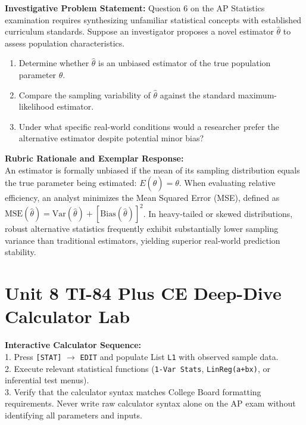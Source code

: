 \begin{frqrubricbox}
\textbf{Investigative Problem Statement:} Question 6 on the AP Statistics examination requires synthesizing unfamiliar statistical concepts with established curriculum standards. Suppose an investigator proposes a novel estimator $\hat{\theta}$ to assess population characteristics.
\begin{enumerate}[label=(\alph*)]
  \item Determine whether $\hat{\theta}$ is an unbiased estimator of the true population parameter $\theta$.
  \item Compare the sampling variability of $\hat{\theta}$ against the standard maximum-likelihood estimator.
  \item Under what specific real-world conditions would a researcher prefer the alternative estimator despite potential minor bias?
\end{enumerate}
\textbf{Rubric Rationale and Exemplar Response:}\\
An estimator is formally unbiased if the mean of its sampling distribution equals the true parameter being estimated: $E(\hat{\theta}) = \theta$. When evaluating relative efficiency, an analyst minimizes the Mean Squared Error (MSE), defined as $\text{MSE}(\hat{\theta}) = \text{Var}(\hat{\theta}) + [\text{Bias}(\hat{\theta})]^2$. In heavy-tailed or skewed distributions, robust alternative statistics frequently exhibit substantially lower sampling variance than traditional estimators, yielding superior real-world prediction stability.
\end{frqrubricbox}\vspace{6pt}
\section{Unit 8 TI-84 Plus CE Deep-Dive Calculator Lab}
\begin{calculatorbox}
\textbf{Interactive Calculator Sequence:}\\
1. Press \texttt{[STAT]} $\rightarrow$ \texttt{EDIT} and populate List \texttt{L1} with observed sample data.\\
2. Execute relevant statistical functions (\texttt{1-Var Stats}, \texttt{LinReg(a+bx)}, or inferential test menus).\\
3. Verify that the calculator syntax matches College Board formatting requirements. Never write raw calculator syntax alone on the AP exam without identifying all parameters and inputs.
\end{calculatorbox}\vspace{10pt}
